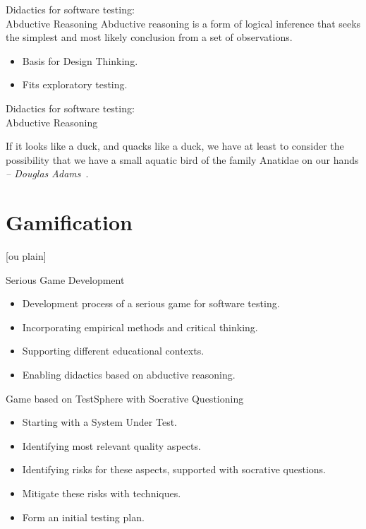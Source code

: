 \documentclass[aspectratio=169]{beamer}
\begin{document}
\begin{frame}{Didactics for software testing:\\Abductive Reasoning}
    Abductive reasoning is a form of logical inference that seeks the simplest and most likely conclusion from a set of observations.~\cite{ContributorstoWikimediaprojects2024Feb} 
    \begin{itemize}
        \item Basis for Design Thinking.
        \item Fits exploratory testing.
    \end{itemize}
\end{frame}

\begin{frame}{Didactics for software testing:\\Abductive Reasoning}
    \begin{blockquote}
    If it looks like a duck, and quacks like a duck, we have at least to consider the possibility that we have a small aquatic bird of the family Anatidae on our hands\\
    \textit{-- Douglas Adams}~\cite{adams1987dirk}.
    \end{blockquote}
\end{frame}

\section{Gamification}

[ou plain]
\begin{frame}{Serious Game Development}
    \begin{itemize}
        \item Development process of a serious game for software testing.
        \item Incorporating empirical methods and critical thinking.
        \item Supporting different educational contexts.
        \item Enabling didactics based on abductive reasoning.
    \end{itemize}
\end{frame}

\begin{frame}{Game based on TestSphere with Socrative Questioning}
    \begin{itemize}
        \item Starting with a System Under Test.
        \item Identifying most relevant quality aspects.
        \item Identifying risks for these aspects, supported with socrative questions.
        \item Mitigate these risks with techniques.
        \item Form an initial testing plan.
    \end{itemize}
\end{frame}
\end{document}
